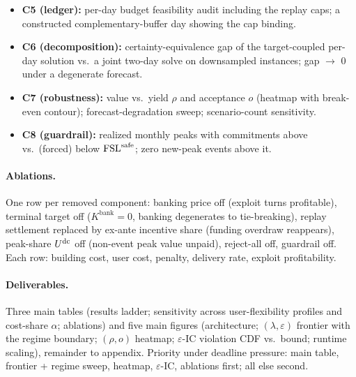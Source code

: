 \begin{itemize}
closed with it enabled.
\item \textbf{C5 (ledger):} per-day budget feasibility audit including
the replay caps; a constructed complementary-buffer day showing the cap
binding.
\item \textbf{C6 (decomposition):} certainty-equivalence gap of the
target-coupled per-day solution vs.\ a joint two-day solve on
downsampled instances; gap $\to$ 0 under a degenerate forecast.
\item \textbf{C7 (robustness):} value vs.\ yield $\rho$ and acceptance
$o$ (heatmap with break-even contour); forecast-degradation sweep;
scenario-count sensitivity.
\item \textbf{C8 (guardrail):} realized monthly peaks with commitments
above vs.\ (forced) below $\mathrm{FSL}^{\mathrm{safe}}$; zero new-peak events above it.
\end{itemize}

\paragraph{Ablations.} One row per removed component: banking price off
(exploit turns profitable), terminal target off ($K^{\mathrm{bank}}{=}  0$,
banking degenerates to tie-breaking), replay settlement replaced by
ex-ante incentive share (funding overdraw reappears), peak-share $U^{\mathrm{dc}}$
off (non-event peak value unpaid), reject-all off, guardrail off. Each
row: building cost, user cost, penalty, delivery rate, exploit
profitability.

\paragraph{Deliverables.} Three main tables (results ladder; sensitivity
across user-flexibility profiles and cost-share $\alpha$; ablations) and
five main figures (architecture; $(\lambda,\varepsilon)$ frontier with
the regime boundary; $(\rho,o)$ heatmap; $\varepsilon$-IC violation CDF
vs.\ bound; runtime scaling), remainder to appendix. Priority under
deadline pressure: main table, frontier + regime sweep, heatmap,
$\varepsilon$-IC, ablations first; all else second.
